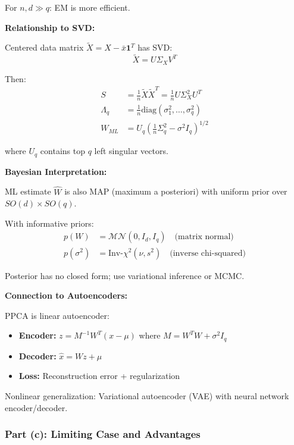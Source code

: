 \documentclass[12pt]{article}
\begin{document}
\begin{explanation}
For $n, d \gg q$: EM is more efficient.

\textbf{Relationship to SVD:}

Centered data matrix $\tilde{X} = X - \bar{x}\mathbf{1}^T$ has SVD:
\[
\tilde{X} = U\Sigma_X V^T
\]

Then:
\begin{align*}
S &= \frac{1}{n}\tilde{X}\tilde{X}^T = \frac{1}{n}U\Sigma_X^2 U^T \\
\Lambda_q &= \frac{1}{n}\text{diag}(\sigma_1^2, \ldots, \sigma_q^2) \\
W_{ML} &= U_q\left(\frac{1}{n}\Sigma_q^2 - \sigma^2 I_q\right)^{1/2}
\end{align*}

where $U_q$ contains top $q$ left singular vectors.

\textbf{Bayesian Interpretation:}

ML estimate $\hat{W}$ is also MAP (maximum a posteriori) with uniform prior over $SO(d) \times SO(q)$.

With informative priors:
\begin{align*}
p(W) &= \mathcal{MN}(0, I_d, I_q) \quad \text{(matrix normal)} \\
p(\sigma^2) &= \text{Inv-}\chi^2(\nu, s^2) \quad \text{(inverse chi-squared)}
\end{align*}

Posterior has no closed form; use variational inference or MCMC.

\textbf{Connection to Autoencoders:}

PPCA is linear autoencoder:
\begin{itemize}
    \item \textbf{Encoder:} $z = M^{-1}W^T(x - \mu)$ where $M = W^TW + \sigma^2I_q$
    \item \textbf{Decoder:} $\hat{x} = Wz + \mu$
    \item \textbf{Loss:} Reconstruction error + regularization
\end{itemize}

Nonlinear generalization: Variational autoencoder (VAE) with neural network encoder/decoder.

\end{explanation}

\subsubsection{Part (c): Limiting Case and Advantages}
\end{document}
